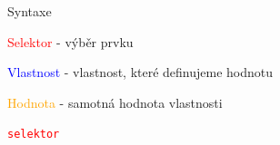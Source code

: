 \documentclass[aspectratio=1610]{beamer}
\begin{document}
\begin{frame}{Syntaxe}
    \begin{cardTiny}
        \begin{flushleft}
            \textcolor{red}{Selektor} - výběr prvku

            \textcolor{blue}{Vlastnost} - vlastnost, které definujeme hodnotu

            \textcolor{orange}{Hodnota} - samotná hodnota vlastnosti
        \end{flushleft}
    \end{cardTiny}

    \begin{cardTiny}
        \begin{alltt}
            \textcolor{red}{selektor} \string{\\
            \textcolor{blue}{vlastnost}: \textcolor{orange}{hodnota};\\
            \string}
        \end{alltt}
    \end{cardTiny}
\end{frame}
\end{document}
